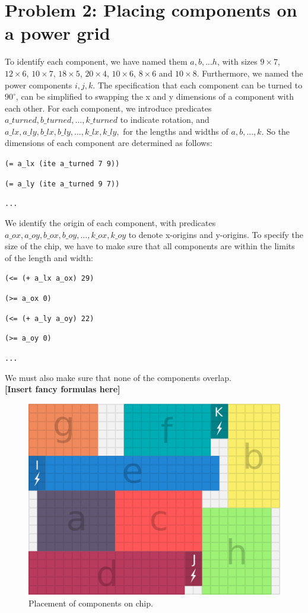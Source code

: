 \documentclass[a4paper]{article}
\begin{document}
	\section*{Problem 2: Placing components on a power grid}
	To identify each component, we have named them $a, b, ... h$, with sizes $9 \times 7$, $12 \times 6$, $10 \times 7$, $18 \times 5$, $20 \times 4$, $10 \times 6$, $8 \times 6$ and $10 \times 8$. Furthermore, we named the power components $i, j, k$. 
	The specification that each component can be turned to $90^{\circ}$, can be simplified to swapping the x and y dimensions of a component with each other. For each component, we introduce predicates $a\_turned, b\_turned, ..., k\_turned$ to indicate rotation, and $a\_lx, a\_ly, b\_lx, b\_ly, ..., k\_lx, k\_ly,$ for the lengths and widths of $a, b, ..., k$. So the dimensions of each component are determined as follows:

	{\tt (= a\_lx (ite a\_turned 7 9))}
	
	{\tt (= a\_ly (ite a\_turned 9 7))}
	
	{\tt ...}
	
	\noindent We identify the origin of each component, with predicates $a\_ox, a\_oy, b\_ox, b\_oy, ..., k\_ox, k\_oy$ to denote x-origins and y-origins. To specify the size of the chip, we have to make sure that all components are within the limits of the length and width:
	
	{\tt (<= (+ a\_lx a\_ox) 29)}
	
	{\tt (>= a\_ox 0)}
	
	{\tt (<= (+ a\_ly a\_oy) 22)}
	
	{\tt (>= a\_oy 0)}
	
	{\tt ...}
	
	\noindent We must also make sure that none of the components overlap.\\
	\textbf{[Insert fancy formulas here]}
	
	\begin{figure}[H]
		\centering
			\includegraphics[scale=0.7]{power-grid-3.png}
		\caption{Placement of components on chip.}
	\end{figure}
	
\end{document}
